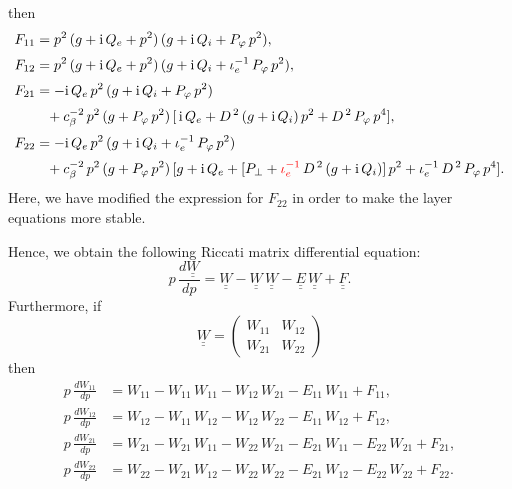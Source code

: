 \documentclass[12pt,prb,aps,notitlepage]{revtex4-1}
\begin{document}
then
\begin{align}\label{f1}
F_{11} &= p^2\,(g+{\rm i}\,Q_e+p^2)\,(g+{\rm i}\,Q_i + P_\varphi\,p^2),\\[0.5ex]
F_{12} &= p^2\,(g+{\rm i}\,Q_e+p^2)\,(g+{\rm i}\,Q_i + \iota_e^{-1}\,P_\varphi\,p^2),\\[0.5ex]
F_{21} &=-{\rm i}\,Q_e\,p^2\,(g+{\rm i}\,Q_i+P_\varphi\,p^2)\nonumber\\[0.5ex]
&\phantom{=} + c_\beta^{-2}\,p^2\,(g+P_\varphi\,p^2)\,[\,{\rm i}\,Q_e+ D^{\,2}\,(g+{\rm i}\,Q_i)\,p^2 + D^{\,2}\,P_\varphi\,p^4],\\[0.5ex]
F_{22} &=-{\rm i}\,Q_e\,p^2\,(g+{\rm i}\,Q_i+\iota_e^{-1}\,P_\varphi\,p^2)\nonumber\\[0.5ex] 
&\phantom{=}+c_\beta^{-2}\,p^2\,(g+P_\varphi\,p^2)\,[g+{\rm i}\,Q_e + [P_\perp + \textcolor{red}{\iota_e^{-1}}\,D^{\,2}\,(g + {\rm i}\,Q_i)]\,p^2 + \iota_e^{-1}\,D^{\,2}\,P_\varphi\,p^4].\label{f4}
\end{align}
Here, we have modified the expression for $F_{22}$ in order to make the layer equations more stable. 

Hence, we obtain the following Riccati matrix differential equation:  
\begin{equation}\label{ricc}
p\,\frac{d\underline{\underline{W}}}{dp} = \underline{\underline{W}} - \underline{\underline{W}}\,\underline{\underline{W}} - \underline{\underline{E}}\,\underline{\underline{W}}
+\underline{\underline{F}}.
\end{equation}
Furthermore, if 
\begin{equation}
\underline{\underline{W}}= \left(\begin{array}{cc} W_{11}&W_{12}\\W_{21}&W_{22}\end{array}\right)
\end{equation}
then
\begin{align}
p\,\frac{dW_{11}}{dp}  &= W_{11}  - W_{11}\,W_{11}-W_{12}\,W_{21}- E_{11}\,W_{11} + F_{11},\\[0.5ex]
p\,\frac{dW_{12}}{dp} &= W_{12} - W_{11}\,W_{12} - W_{12}\,W_{22} - E_{11}\,W_{12} + F_{12},\\[0.5ex]
p\,\frac{dW_{21}}{dp} &= W_{21} -W_{21}\,W_{11}- W_{22}\,W_{21} - E_{21}\,W_{11} - E_{22}\,W_{21} + F_{21},\\[0.5ex]
p\,\frac{dW_{22}}{dp} &= W_{22} -W_{21}\,W_{12}- W_{22}\,W_{22}- E_{21}\,W_{12} - E_{22}\,W_{22} + F_{22}.
\end{align}
\end{document}
